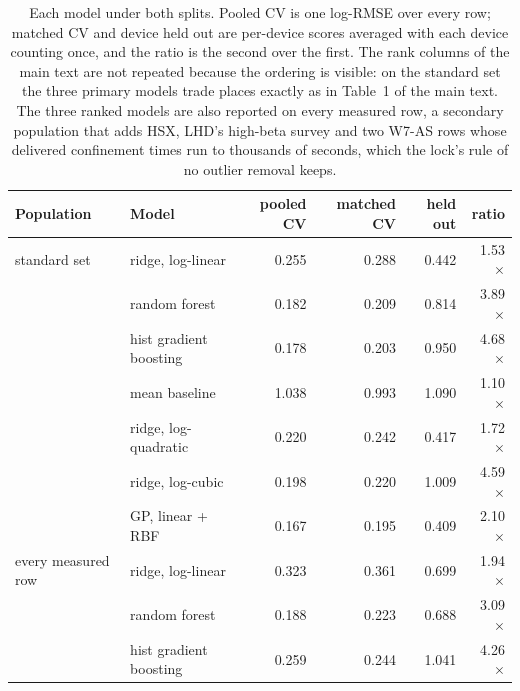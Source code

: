 \documentclass[12pt,letterpaper]{article}
\begin{document}
\begin{table}[htbp]
\centering\small
\caption{Each model under both splits. Pooled CV is one log-RMSE over every
row; matched CV and device held out are per-device scores averaged with each
device counting once, and the ratio is the second over the first. The rank
columns of the main text are not repeated because the ordering is visible: on
the standard set the three primary models trade places exactly as in
Table~1 of the main text. The three ranked models are also reported on every
measured row, a secondary population that adds HSX, LHD's high-beta survey and
two W7-AS rows whose delivered confinement times run to thousands of seconds,
which the lock's rule of no outlier removal keeps.}
\label{tab:ishcdb-result}
\begin{tabular}{llrrrr}
\toprule
Population & Model & pooled CV & matched CV & held out & ratio \\
\midrule
standard set & ridge, log-linear & 0.255 & 0.288 & 0.442 & 1.53$\times$ \\
 & random forest & 0.182 & 0.209 & 0.814 & 3.89$\times$ \\
 & hist gradient boosting & 0.178 & 0.203 & 0.950 & 4.68$\times$ \\
 & mean baseline & 1.038 & 0.993 & 1.090 & 1.10$\times$ \\
 & ridge, log-quadratic & 0.220 & 0.242 & 0.417 & 1.72$\times$ \\
 & ridge, log-cubic & 0.198 & 0.220 & 1.009 & 4.59$\times$ \\
 & GP, linear + RBF & 0.167 & 0.195 & 0.409 & 2.10$\times$ \\
\midrule
every measured row & ridge, log-linear & 0.323 & 0.361 & 0.699 & 1.94$\times$ \\
 & random forest & 0.188 & 0.223 & 0.688 & 3.09$\times$ \\
 & hist gradient boosting & 0.259 & 0.244 & 1.041 & 4.26$\times$ \\
\bottomrule
\end{tabular}
\par\smallskip{}
\end{table}
\end{document}
